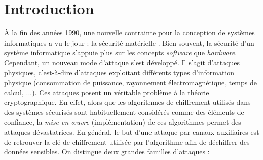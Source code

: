 \documentclass[oneside]{book}
\begin{document}
\section{Introduction}
\label{sec:att}

\vspace{-0.1 cm}À la fin des années 1990, une nouvelle contrainte pour la conception de systèmes informatiques a vu le jour : la sécurité matérielle \cite{didact_approche}. Bien souvent, la sécurité d'un système informatique s'appuie plus sur les concepts \textit{software} que \textit{hardware}. Cependant, un nouveau mode d'attaque s'est développé. Il s'agit d'attaques physiques, c'est-à-dire d'attaques exploitant différents types d’information physique (consommation de puissance, rayonnement électromagnétique, temps de calcul, ...). Ces attaques posent un véritable problème à la théorie cryptographique. En effet, alors que les algorithmes de chiffrement utilisés dans des systèmes sécurisés sont habituellement considérés comme des éléments de confiance, la \textit{mise en œuvre} (implémentation) de ces algorithmes permet des attaques dévastatrices. En général, le but d'une attaque par canaux auxiliaires est de retrouver la clé de chiffrement utilisée par l'algorithme afin de déchiffrer des données sensibles. On distingue deux grandes familles d'attaques : 
\end{document}
